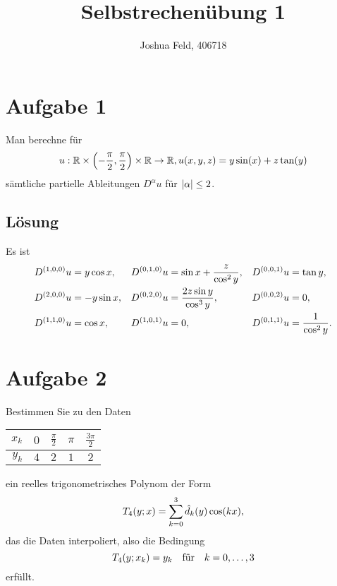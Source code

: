 \documentclass{exercise}
\institute{Applied and Computational Mathematics}
\title{Selbstrechenübung 1}
\author{Joshua Feld, 406718}
\begin{document}
    \maketitle


    \section*{Aufgabe 1}

    \begin{problem}
        Man berechne für
        \[
            u: \R \times \parentheses*{-\frac{\pi}{2}, \frac{\pi}{2}} \times \R \to \R, u\parentheses*{x, y, z} = y\sin\parentheses*{x} + z\tan\parentheses*{y}
        \]
        sämtliche partielle Ableitungen \(D^\alpha u\) für \(\absolute*{\alpha} \le 2\).
    \end{problem}

    \subsection*{Lösung}
    Es ist
    \begin{align*}
        D^{\parentheses*{1, 0, 0}}u &= y\cos x, & D^{\parentheses*{0, 1, 0}}u &= \sin x + \frac{z}{\cos^2 y}, & D^{\parentheses*{0, 0, 1}}u &= \tan y,\\
        D^{\parentheses*{2, 0, 0}}u &= -y\sin x, & D^{\parentheses*{0, 2, 0}}u &= \frac{2z\sin y}{\cos^3 y}, & D^{\parentheses*{0, 0, 2}}u &= 0,\\
        D^{\parentheses*{1, 1, 0}}u &= \cos x, & D^{\parentheses*{1, 0, 1}}u &= 0, & D^{\parentheses*{0, 1, 1}}u &= \frac{1}{\cos^2 y}.
    \end{align*}


    \section*{Aufgabe 2}

    \begin{problem}
        Bestimmen Sie zu den Daten
        \begin{center}
            \begin{tabular}{rcccc}
                \toprule
                \(x_k\) & \(0\) & \(\frac{\pi}{2}\) & \(\pi\) & \(\frac{3\pi}{2}\)\\
                \midrule
                \(y_k\) & \(4\) & \(2\) & \(1\) & \(2\)\\
                \bottomrule
            \end{tabular}
        \end{center}
        ein reelles trigonometrisches Polynom der Form
        \[
            T_4\parentheses*{y; x} = \sum_{k = 0}^3 \hat{d}_k\parentheses*{y}\cos\parentheses*{kx},
        \]
        das die Daten interpoliert, also die Bedingung
        \[
            T_4\parentheses*{y; x_k} = y_k \quad \text{für} \quad k = 0, \ldots, 3
        \]
        erfüllt.
    \end{problem}
\end{document}
